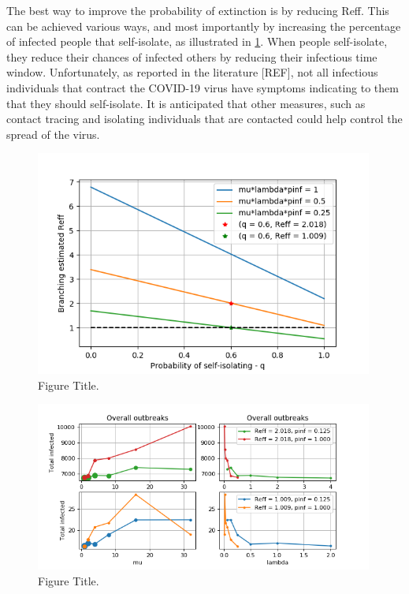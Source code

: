 \documentclass[sr]{drdc-report}
\begin{document}
The best way to improve the probability of extinction is by reducing Reff. This can be achieved various ways, and most importantly by increasing the percentage of infected people that self-isolate, as illustrated in \ref{fig_plt_brReffvsq}. When people self-isolate, they reduce their chances of infected others by reducing their infectious time window. Unfortunately, as reported in the literature [REF], not all infectious individuals that contract the COVID-19 virus have symptoms indicating to them that they should self-isolate. It is anticipated that other measures, such as contact tracing and isolating individuals that are contacted could help control the spread of the virus. 


\begin{figure}
  \includegraphics[width=0.99\textwidth, keepaspectratio=true]{figures/plt_brReffvsq}
  \caption{Figure Title.}\label{fig_plt_brReffvsq}
\end{figure}

\begin{figure}
  \includegraphics[width=0.99\textwidth, keepaspectratio=true]{figures/Ninf_exp1}
  \caption{Figure Title.}\label{fig_plt_NinfExp1}
\end{figure}
\end{document}
